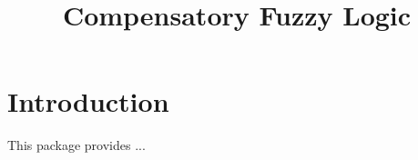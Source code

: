 \documentclass[a4paper, 11pt]{article}
\begin{document}

\title{Compensatory Fuzzy Logic} 

\maketitle

\tableofcontents


\section{Introduction}

This package provides ...

\scriptsize
\normalsize
\end{document}
